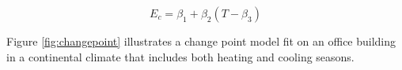 \begin{equation}
\label{eq:coolingenergy}
E_c = \beta_1 + \beta_2(T - \beta_3)
\end{equation}

Figure \ref{fig:changepoint} illustrates a change point model fit on an office building in a continental climate that includes both heating and cooling seasons.